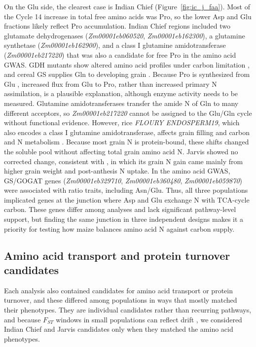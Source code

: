 \documentclass[namedate,unnumsec,webpdf,contemporary,large]{oup-authoring-template}
\begin{document}
On the Glu side, the clearest case is Indian Chief (Figure~\ref{fig:ic_j_faa}). Most of the Cycle 14 increase in total free amino acids was Pro, so the lower Asp and Glu fractions likely reflect Pro accumulation. Indian Chief regions included two glutamate dehydrogenases (\textit{Zm00001eb060520}, \textit{Zm00001eb162300}), a glutamine synthetase (\textit{Zm00001eb162900}), and a class I glutamine amidotransferase (\textit{Zm00001eb217220}) that was also a candidate for free Pro in the amino acid GWAS. GDH mutants show altered amino acid profiles under carbon limitation \citep{Miyashita2008GDH, Dellero2020AminoNUE}, and cereal GS supplies Gln to developing grain \citep{Wei2021WheatGS, Fujita2022RiceGS13}. Because Pro is synthesized from Glu \citep{Alvarez2022ProHub}, increased flux from Glu to Pro, rather than increased primary N assimilation, is a plausible explanation, although enzyme activity needs to be measured. Glutamine amidotransferases transfer the amide N of Gln to many different acceptors, so \textit{Zm00001eb217220} cannot be assigned to the Glu/Gln cycle without functional evidence. However, rice \textit{FLOURY ENDOSPERM19}, which also encodes a class I glutamine amidotransferase, affects grain filling and carbon and N metabolism \citep{Lou2021FLO19}. Because most grain N is protein-bound, these shifts changed the soluble pool without affecting total grain amino acid N. Jarvis showed no corrected change, consistent with \citet{Moll1994}, in which its grain N gain came mainly from higher grain weight and post-anthesis N uptake. In the amino acid GWAS, GS/GOGAT genes (\textit{Zm00001eb329710}, \textit{Zm00001eb360480}, \textit{Zm00001eb059870}) were associated with ratio traits, including Asn/Glu. Thus, all three populations implicated genes at the junction where Asp and Glu exchange N with TCA-cycle carbon. These genes differ among analyses and lack significant pathway-level support, but finding the same junction in three independent designs makes it a priority for testing how maize balances amino acid N against carbon supply.

\subsection{Amino acid transport and protein turnover candidates}

Each analysis also contained candidates for amino acid transport or protein turnover, and these differed among populations in ways that mostly matched their phenotypes. They are individual candidates rather than recurring pathways, and because $F_{ST}$ windows in small populations can reflect drift \citep{Gerke2015DriftRRS}, we considered Indian Chief and Jarvis candidates only when they matched the amino acid phenotypes.
\end{document}
